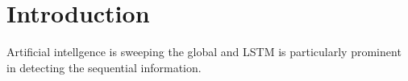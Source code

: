 \section{Introduction}
Artificial intellgence is sweeping the global and 
LSTM is particularly prominent in detecting the sequential information. 